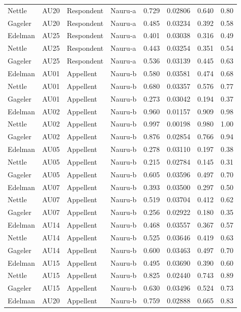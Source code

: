 \documentclass{monashthesis}
\begin{document}
\begin{center}
\begin{longtable}{llllllll}
Nettle & AU20 & Respondent & Nauru-a & 0.729 & 0.02806 & 0.640 & 0.80 \\
Gageler & AU20 & Respondent & Nauru-a & 0.485 & 0.03234 & 0.392 & 0.58 \\
Edelman & AU25 & Respondent & Nauru-a & 0.401 & 0.03038 & 0.316 & 0.49 \\
Nettle & AU25 & Respondent & Nauru-a & 0.443 & 0.03254 & 0.351 & 0.54 \\
Gageler & AU25 & Respondent & Nauru-a & 0.536 & 0.03139 & 0.445 & 0.63 \\
Edelman & AU01 & Appellent & Nauru-b & 0.580 & 0.03581 & 0.474 & 0.68 \\
Nettle & AU01 & Appellent & Nauru-b & 0.680 & 0.03357 & 0.576 & 0.77 \\
Gageler & AU01 & Appellent & Nauru-b & 0.273 & 0.03042 & 0.194 & 0.37 \\
Edelman & AU02 & Appellent & Nauru-b & 0.960 & 0.01157 & 0.909 & 0.98 \\
Nettle & AU02 & Appellent & Nauru-b & 0.997 & 0.00198 & 0.980 & 1.00 \\
Gageler & AU02 & Appellent & Nauru-b & 0.876 & 0.02854 & 0.766 & 0.94 \\
Edelman & AU05 & Appellent & Nauru-b & 0.278 & 0.03110 & 0.197 & 0.38 \\
Nettle & AU05 & Appellent & Nauru-b & 0.215 & 0.02784 & 0.145 & 0.31 \\
Gageler & AU05 & Appellent & Nauru-b & 0.605 & 0.03596 & 0.497 & 0.70 \\
Edelman & AU07 & Appellent & Nauru-b & 0.393 & 0.03500 & 0.297 & 0.50 \\
Nettle & AU07 & Appellent & Nauru-b & 0.519 & 0.03704 & 0.412 & 0.62 \\
Gageler & AU07 & Appellent & Nauru-b & 0.256 & 0.02922 & 0.180 & 0.35 \\
Edelman & AU14 & Appellent & Nauru-b & 0.468 & 0.03557 & 0.367 & 0.57 \\
Nettle & AU14 & Appellent & Nauru-b & 0.525 & 0.03646 & 0.419 & 0.63 \\
Gageler & AU14 & Appellent & Nauru-b & 0.600 & 0.03463 & 0.497 & 0.70 \\
Edelman & AU15 & Appellent & Nauru-b & 0.495 & 0.03690 & 0.390 & 0.60 \\
Nettle & AU15 & Appellent & Nauru-b & 0.825 & 0.02440 & 0.743 & 0.89 \\
Gageler & AU15 & Appellent & Nauru-b & 0.630 & 0.03496 & 0.524 & 0.73 \\
Edelman & AU20 & Appellent & Nauru-b & 0.759 & 0.02888 & 0.665 & 0.83 \\

\end{longtable}
\end{center}
\end{document}
